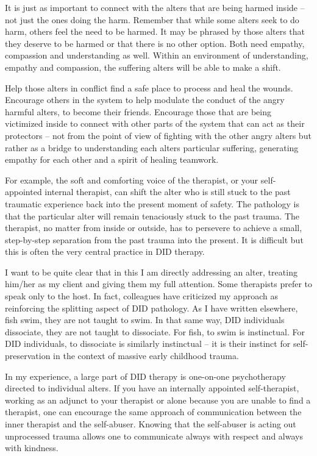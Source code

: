 \documentclass[]{book}
\begin{document}
It is just as important to connect with the alters that are being harmed inside -- not just the ones doing the harm. Remember that while some alters seek to do harm, others feel the need to be harmed. It may be phrased by those alters that they deserve to be harmed or that there is no other option. Both need empathy, compassion and understanding as well. Within an environment of understanding, empathy and compassion, the suffering alters will be able to make a shift.

Help those alters in conflict find a safe place to process and heal the wounds. Encourage others in the system to help modulate the conduct of the angry harmful alters, to become their friends. Encourage those that are being victimized inside to connect with other parts of the system that can act as their protectors -- not from the point of view of fighting with the other angry alters but rather as a bridge to understanding each alters particular suffering, generating empathy for each other and a spirit of healing teamwork.

For example, the soft and comforting voice of the therapist, or your self-appointed internal therapist, can shift the alter who is still stuck to the past traumatic experience back into the present moment of safety. The pathology is that the particular alter will remain tenaciously stuck to the past trauma. The therapist, no matter from inside or outside, has to persevere to achieve a small, step-by-step separation from the past trauma into the present. It is difficult but this is often the very central practice in DID therapy.

I want to be quite clear that in this I am directly addressing an alter, treating him/her as my client and giving them my full attention. Some therapists prefer to speak only to the host. In fact, colleagues have criticized my approach as reinforcing the splitting aspect of DID pathology. As I have written elsewhere, fish swim, they are not taught to swim. In that same way, DID individuals dissociate, they are not taught to dissociate. For fish, to swim is instinctual. For DID individuals, to dissociate is similarly instinctual -- it is their instinct for self-preservation in the context of massive early childhood trauma.

In my experience, a large part of DID therapy is one-on-one psychotherapy directed to individual alters. If you have an internally appointed self-therapist, working as an adjunct to your therapist or alone because you are unable to find a therapist, one can encourage the same approach of communication between the inner therapist and the self-abuser. Knowing that the self-abuser is acting out unprocessed trauma allows one to communicate always with respect and always with kindness.
\end{document}
